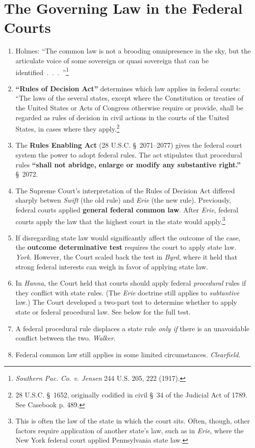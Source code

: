 \section{The Governing Law in the Federal Courts}

\begin{enumerate}
    \item Holmes: ``The common law is not a brooding omnipresence in the sky, 
    but the articulate voice of some sovereign or quasi sovereign that can be 
    identified~.~.~.~''\footnote{\emph{Southern Pac. Co. v. Jensen} 244 U.S. 205, 
    222 (1917).}
    \item \textbf{``Rules of Decision Act''} determines which law applies in 
    federal courts: ``The laws of the several states, except where the 
    Constitution or treaties of the United States or Acts of Congress 
    otherwise require or provide, shall be regarded as rules of decision in 
    civil actions in the courts of the United States, in cases where they 
    apply.\footnote{28 U.S.C. \S\ 1652, originally codified in civil \S\ 34 of 
    the Judicial Act of 1789. See Casebook p. 489.}
    \item The \textbf{Rules Enabling Act} (28 U.S.C. \S\ 2071--2077) gives the 
    federal court system the power to adopt federal rules. The act stipulates 
    that procedural rules \textbf{``shall not abridge, enlarge or modify any 
    substantive right.''} \S\ 2072.
    \item The Supreme Court's interpretation of the Rules of Decision Act 
    differed sharply betwen \emph{Swift} (the old rule) and \emph{Erie} (the 
    new rule). Previously, federal courts applied \textbf{general federal 
    common law}. After \emph{Erie}, federal courts apply the law that the 
    highest court in the state would apply.\footnote{This is often the law of 
    the state in which the court sits. Often, though, other factors require 
    application of another state's law, such as in \emph{Erie}, where the New 
    York federal court applied Pennsylvania state law.}
    \item If disregarding state law would significantly affect the outcome of 
    the case, the \textbf{outcome determinative test} requires the court to 
    apply state law. \emph{York}. However, the Court scaled back the test in 
    \emph{Byrd}, where it held that strong federal interests can weigh in 
    favor of applying state law.
    \item In \emph{Hanna}, the Court held that courts should apply federal 
    \emph{procedural} rules if they conflict with state rules. (The 
    \emph{Erie} doctrine still applies to \emph{subtantive} law.) The Court 
    developed a two-part test to determine whether to apply state or federal 
    procedural law. See below for the full test.
    \item A federal procedural rule displaces a state rule \emph{only if} 
    there is an unavoidable conflict between the two. \emph{Walker}.
    \item Federal common law still applies in some limited circumstances. 
    \emph{Clearfield}.
\end{enumerate}

